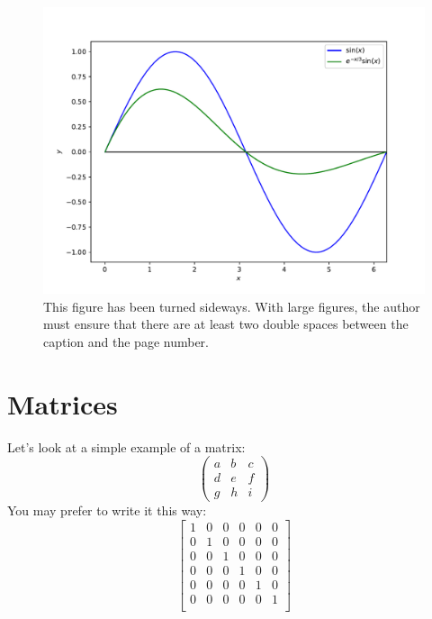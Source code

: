 \thispagestyle{lscapedplain}
\begin{landscape}
\begin{figure}
\centering
\includegraphics[width=\textwidth]{Chapter-2/figs/sine}
\caption{This figure has been turned sideways.  With large figures, 
         the author must ensure that there are at least two double spaces
         between the caption and the page number.}
\label{fig:hist}
\end{figure}
\end{landscape}
\restoregeometry
\pagestyle{plain}
\thispagestyle{plain}


\section{Matrices}
Let's look at a simple example of a matrix:
\[ \left( \begin{array}{ccc}
a & b & c \\
d & e & f \\
g & h & i \end{array} \right)\] 
%
You may prefer to write it this way:
\[ \left[\begin{array} {cccccc}
1 & 0 & 0 & 0 & 0 & 0 \\
0 & 1 & 0 & 0 & 0 & 0 \\
0 & 0 & 1 & 0 & 0 & 0 \\
0 & 0 & 0 & 1 & 0 & 0 \\
0 & 0 & 0 & 0 & 1 & 0 \\
0 & 0 & 0 & 0 & 0 & 1 \\
\end{array} \right] \]
